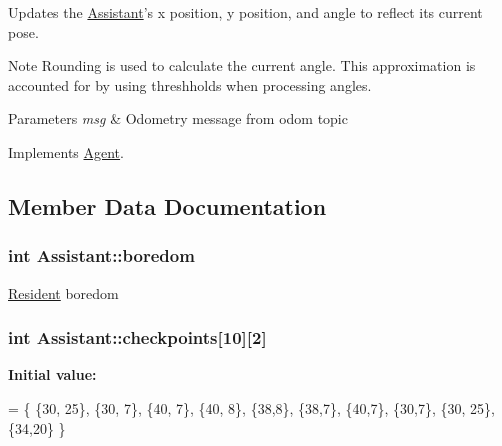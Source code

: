 Updates the \hyperlink{classAssistant}{Assistant}'s x position, y position, and angle to reflect its current pose. 

\begin{DoxyNote}{Note}
Rounding is used to calculate the current angle. This approximation is accounted for by using threshholds when processing angles. 
\end{DoxyNote}

\begin{DoxyParams}{Parameters}
{\em msg} & Odometry message from odom topic \\
\hline
\end{DoxyParams}


Implements \hyperlink{classAgent}{Agent}.



\subsection{Member Data Documentation}
\hypertarget{classAssistant_a1f237fcda74950177c10cc26ea778863}{
\subsubsection[{boredom}]{\setlength{\rightskip}{0pt plus 5cm}int Assistant\-::boredom\hspace{0.3cm}{\ttfamily [protected]}}}\label{classAssistant_a1f237fcda74950177c10cc26ea778863}
\hyperlink{classResident}{Resident} boredom \hypertarget{classAssistant_ac3c8eb895beffec2e70b25184c7fcae9}{
\subsubsection[{checkpoints}]{\setlength{\rightskip}{0pt plus 5cm}int Assistant\-::checkpoints\mbox{[}10\mbox{]}\mbox{[}2\mbox{]}\hspace{0.3cm}{\ttfamily [protected]}}}\label{classAssistant_ac3c8eb895beffec2e70b25184c7fcae9}
{\bfseries Initial value\-:}
\begin{DoxyCode}
= \{  
        \{30, 25\}, 
        \{30, 7\}, 
        \{40, 7\},
        \{40, 8\},
        \{38,8\},
        \{38,7\},
        \{40,7\},
        \{30,7\},
        \{30, 25\},
        \{34,20\}
        \}
\end{DoxyCode}


